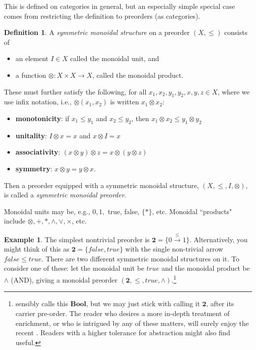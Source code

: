 \documentclass[a4paper]{book}
\theoremstyle{definition}
\newtheorem{example}{Example}[section]
\theoremstyle{definition}
\newtheorem{definition}{Definition}[section]
\theoremstyle{definition}
\theoremstyle{theorem}
\theoremstyle{definition}
\begin{document}
This is defined on categories in general, but an especially simple special case comes from restricting the definition to preorders (as categories). 
\begin{definition}
	A \textit{symmetric monoidal structure} on a preorder $(X, \leq)$ consists of
	\begin{itemize}
		\item an element $I \in X$ called the monoidal unit, and 
		\item a function $\otimes: X \times X \rightarrow X$, called the monoidal product.
	\end{itemize}
	These must further satisfy the following, for all $x_1,x_2, y_1, y_2, x, y, z \in X$, where we use infix notation, i.e., $\otimes(x_1,x_2)$ is written $x_1 \otimes x_2$: 
	\begin{itemize}
		\item \textbf{monotonicity}: if $x_1 \leq y_1$ and $x_2 \leq y_2$, then $x_1 \otimes x_2 \leq y_1 \otimes y_2$
		\item \textbf{unitality}: $I \otimes x = x$ and $x \otimes I = x$
		\item \textbf{associativity}: $(x \otimes y) \otimes z = x \otimes (y \otimes z)$
		\item \textbf{symmetry}: $x \otimes y = y \otimes x$. 
	\end{itemize}
	Then a preorder equipped with a symmetric monoidal structure, $(X, \leq, I, \otimes)$, is called a \textit{symmetric monoidal preorder}.
\end{definition} \noindent  
Monoidal units may be, e.g., $0, 1,$ true, false, $\{*\}$, etc. Monoidal ``products" include $\otimes, +, *, \wedge, \vee, \times$, etc.
\begin{example}
	The simplest nontrivial preorder is $\textbf{2} = \{0 \xrightarrow{\leq} 1\}$. Alternatively, you might think of this as $\textbf{2} = \{false, true\}$ with the single non-trivial arrow $false \leq true$. There are two different symmetric monoidal structures on it. To consider one of these: let the monoidal unit be $true$ and the monoidal product be $\wedge$ (AND), giving a monoidal preorder $(\textbf{2}, \leq, true, \wedge)$.\footnote{\cite{fong_seven_2018} sensibly calls this $\textbf{Bool}$, but we may just stick with calling it $\textbf{2}$, after its carrier pre-order. The reader who desires a more in-depth treatment of enrichment, or who is intrigued by any of these matters, will surely enjoy the recent \cite{fong_seven_2018}. Readers with a higher tolerance for abstraction might also find \cite{kelly_basic_2005} useful.} 
\end{example}
\end{document}
